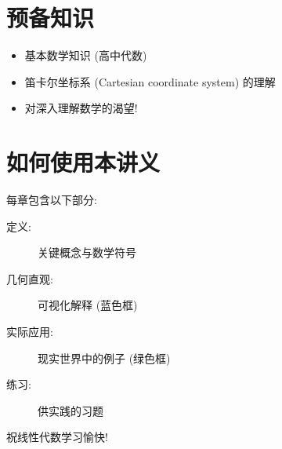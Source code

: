 \section*{预备知识}
\begin{itemize}
    \item 基本数学知识 (高中代数)
    \item 笛卡尔坐标系 (Cartesian coordinate system) 的理解
    \item 对深入理解数学的渴望!
\end{itemize}

\section*{如何使用本讲义}
每章包含以下部分:
\begin{description}
    \item[定义:] 关键概念与数学符号
    \item[几何直观:] 可视化解释 (蓝色框)
    \item[实际应用:] 现实世界中的例子 (绿色框)
    \item[练习:] 供实践的习题
\end{description}

\begin{flushright}
祝线性代数学习愉快!
\end{flushright}


























